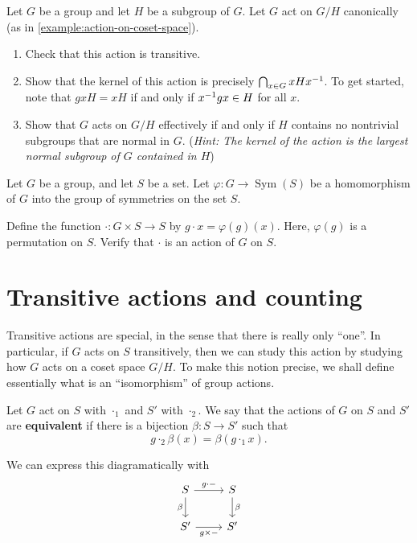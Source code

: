 \documentclass[./main.tex]{subfiles}
\begin{document}
\begin{exercise}
\label{exercise:action-on-coset-space}
Let $G$ be a group and let $H$ be a subgroup of $G$. Let $G$ act on $G/H$
canonically (as in \cref{example:action-on-coset-space}).

\begin{enumerate}[label=(\roman*)]
    \item Check that this action is transitive. 
    \item Show that the kernel of this action is precisely $\bigcap_{x \in G}
    xHx^{-1}$. To get started, note that $gxH = xH$ if and only if $x^{-1} gx \in
    H$ for all $x$.
    \item Show that $G$ acts on $G/H$ effectively if and only if $H$ contains no
    nontrivial subgroups that are normal in $G$. (\textit{Hint: The kernel of
    the action is the largest normal subgroup of $G$ contained in $H$})
\end{enumerate}
\end{exercise}

\begin{exercise}
\label{exercise:homomorphism-inducing-group-action}
    Let $G$ be a group, and let $S$ be a set. Let $\varphi: G \to
    \operatorname{Sym}(S)$ be a homomorphism of $G$ into the group of symmetries
    on the set $S$.

    Define the function $\cdot: G \times S \to S$ by $g \cdot x =
    \varphi(g)(x)$. Here, $\varphi(g)$ is a permutation on $S$.
    Verify that $\cdot$ is an action of $G$ on $S$.
\end{exercise}

\section{Transitive actions and counting}
Transitive actions are special, in the sense that there is really only ``one''.
In particular, if $G$ acts on $S$ transitively, then we can study this action by
studying how $G$ acts on a coset space $G/H$. To make this notion precise, we
shall define essentially what is an ``isomorphism'' of group actions.
\begin{definition}
    Let $G$ act on $S$ with $\cdot_1$ and $S'$ with $\cdot_2$. We say that the
    actions of $G$ on $S$ and $S'$ are \textbf{equivalent} if there is a
    bijection $\beta: S \to S'$ such that
    \[
        g \cdot_2 \beta(x) = \beta(g \cdot_1 x).
    \]
\end{definition}
We can express this diagramatically with 
\[\begin{tikzcd}
	S & S \\
	{S'} & {S'}
	\arrow["{g \cdot -}", from=1-1, to=1-2]
	\arrow["\beta"', from=1-1, to=2-1]
	\arrow["\beta", from=1-2, to=2-2]
	\arrow["{g \times -}"', from=2-1, to=2-2]
\end{tikzcd}\] 
\end{document}
